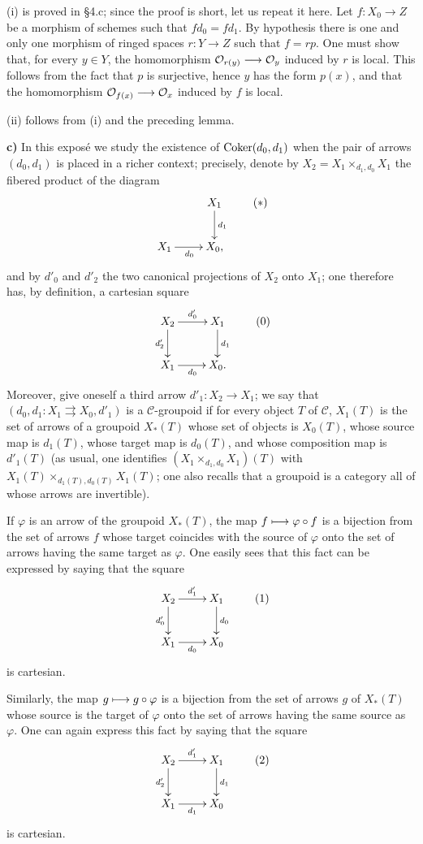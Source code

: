 (i) is proved in §4.c; since the proof is short, let us repeat it here. Let $f:X_0\to Z$ be a morphism of schemes such that $fd_0=fd_1$. By hypothesis there is one and only one morphism of ringed spaces $r:Y\to Z$ such that $f=rp$. One must show that, for every $y\in Y$, the homomorphism $\mathcal{O}_{r(y)}\longrightarrow\mathcal{O}_y$ induced by $r$ is local. This follows from the fact that $p$ is surjective, hence $y$ has the form $p(x)$, and that the homomorphism $\mathcal{O}_{f(x)}\longrightarrow\mathcal{O}_x$ induced by $f$ is local.

(ii) follows from (i) and the preceding lemma.

\textbf{c)} In this exposé we study the existence of $\operatorname{Coker}(d_0,d_1)$ when the pair of arrows $(d_0,d_1)$ is placed in a richer context; precisely, denote by $X_2=X_1\times_{d_1,d_0}X_1$ the fibered product of the diagram
\[
\xymatrix{&X_1\ar[d]^{d_1}\\X_1\ar[r]_{d_0}&X_0,}\tag{$*$}
\]
and by $d'_0$ and $d'_2$ the two canonical projections of $X_2$ onto $X_1$; one therefore has, by definition, a cartesian square
\[
\xymatrix{X_2\ar[r]^{d'_0}\ar[d]_{d'_2}&X_1\ar[d]^{d_1}\\X_1\ar[r]_{d_0}&X_0.}\tag{0}
\]
Moreover, give oneself a third arrow $d'_1:X_2\to X_1$; we say that $(d_0,d_1:X_1\rightrightarrows X_0,d'_1)$ is a $\mathcal C$-groupoid if for every object $T$ of $\mathcal C$, $X_1(T)$ is the set of arrows of a groupoid $X_*(T)$ whose set of objects is $X_0(T)$, whose source map is $d_1(T)$, whose target map is $d_0(T)$, and whose composition map is $d'_1(T)$ (as usual, one identifies $(X_1\times_{d_1,d_0}X_1)(T)$ with $X_1(T)\times_{d_1(T),d_0(T)}X_1(T)$; one also recalls that a groupoid is a category all of whose arrows are invertible).

If $\varphi$ is an arrow of the groupoid $X_*(T)$, the map $f\longmapsto\varphi\circ f$ is a bijection from the set of arrows $f$ whose target coincides with the source of $\varphi$ onto the set of arrows having the same target as $\varphi$. One easily sees that this fact can be expressed by saying that the square
\[
\xymatrix{X_2\ar[r]^{d'_1}\ar[d]_{d'_0}&X_1\ar[d]^{d_0}\\X_1\ar[r]_{d_0}&X_0}\tag{1}
\]
is cartesian.

Similarly, the map $g\longmapsto g\circ\varphi$ is a bijection from the set of arrows $g$ of $X_*(T)$ whose source is the target of $\varphi$ onto the set of arrows having the same source as $\varphi$. One can again express this fact by saying that the square
\[
\xymatrix{X_2\ar[r]^{d'_1}\ar[d]_{d'_2}&X_1\ar[d]^{d_1}\\X_1\ar[r]_{d_1}&X_0}\tag{2}
\]
is cartesian.

